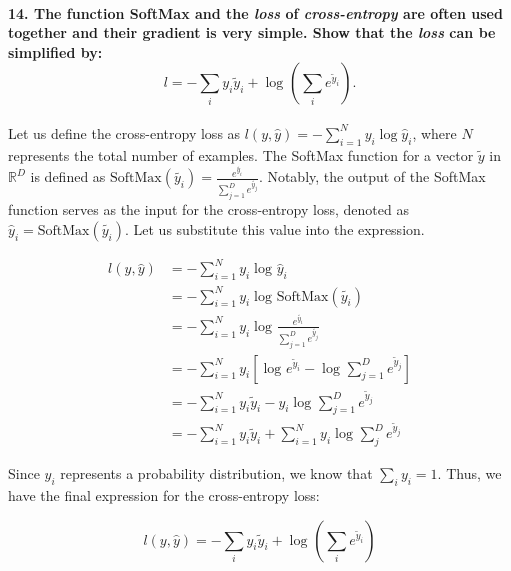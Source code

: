 \documentclass{article}
\theoremstyle{plain}%
\theoremstyle{definition}
\theoremstyle{remark}
\begin{document}
\paragraph{14. The function SoftMax and the \textit{loss} of \textit{cross-entropy} are often used together and their gradient is very simple. Show that the \textit{loss} can be simpliﬁed by:
    \[l = - \sum_{i}^{} y_i \tilde{y}_i + \log_{} (\sum_{i}^{} e^{\tilde{y}_i}).\]}
Let us define the cross-entropy loss as \( l(y, \hat{y}) = - \sum_{i=1}^{N} y_i \log \hat{y}_i \), where \( N \) represents the total number of examples. The SoftMax function for a vector \( \tilde{y} \) in \( \mathbb{R}^D \) is defined as \( \text{SoftMax}(\tilde{y_i}) = \frac{e^{\tilde{y_i}}}{\sum_{j=1}^{D} e^{\tilde{y_j}}} \). Notably, the output of the SoftMax function serves as the input for the cross-entropy loss, denoted as \( \hat{y}_i = \text{SoftMax}(\tilde{y_i}) \). Let us substitute this value into the expression.

\begin{align*}
    l(y, \hat{y}) & = - \sum_{i=1}^{N} y_i \log_{} \hat{y}_i                                                                \\
                  & = - \sum_{i=1}^{N} y_i \log_{} \text{SoftMax}(\tilde{y_i})                                              \\
                  & = - \sum_{i=1}^{N} y_i \log_{} \frac{e^{\tilde{y_i}}}{\sum_{j=1}^{D} e^{\tilde{y_j}} }                  \\
                  & = - \sum_{i=1}^{N} y_i \left[ \log_{} e^{\tilde{y}_i} - \log_{} \sum_{j=1}^{D} e^{\tilde{y}_j}  \right] \\
                  & = - \sum_{i=1}^{N} y_i \tilde{y}_i - y_i \log_{} \sum_{j=1}^{D}e^{\tilde{y}_j}                          \\
                  & = - \sum_{i=1}^{N} y_i \tilde{y}_i + \sum_{i=1}^{N} y_i \log_{} \sum_{j}^{D}e^{\tilde{y}_j}
\end{align*}

Since $y_i$ represents a probability distribution, we know that $\sum_i y_i = 1$. Thus, we have the final expression for the cross-entropy loss:

$$ l(y, \hat{y}) = - \sum_{i}^{} y_i \tilde{y}_i + \log_{} \left(\sum_{i}^{} e^{\tilde{y}_i}\right) $$
\end{document}
